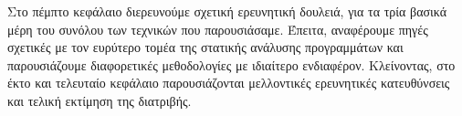 
\vspace{2em}
Στο πέμπτο κεφάλαιο διερευνούμε σχετική ερευνητική δουλειά, για τα
τρία βασικά μέρη του συνόλου των τεχνικών που παρουσιάσαμε. Έπειτα,
αναφέρουμε πηγές σχετικές με τον ευρύτερο τομέα της στατικής ανάλυσης
προγραμμάτων και παρουσιάζουμε διαφορετικές μεθοδολογίες με ιδιαίτερο
ενδιαφέρον.
%
Κλείνοντας, στο έκτο και τελευταίο κεφάλαιο παρουσιάζονται μελλοντικές
ερευνητικές κατευθύνσεις και τελική εκτίμηση της διατριβής.


